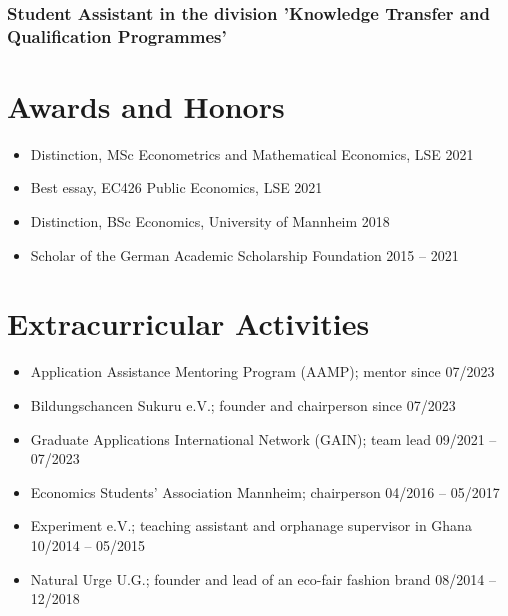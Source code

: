 \documentclass[a4paper, english, 10pt]{cv_class}
\begin{document}
\subsubsection{Student Assistant in the division 'Knowledge Transfer and Qualification Programmes'}

\section{Awards and Honors}

\begin{itemize}[noitemsep]
	\item Distinction, MSc Econometrics and Mathematical Economics, LSE \hfill 2021
	\item Best essay, EC426 Public Economics, LSE \hfill 2021
	\item Distinction, BSc Economics, University of Mannheim \hfill 2018
	\item Scholar of the German Academic Scholarship Foundation \hfill 2015 -- 2021
\end{itemize}

\section{Extracurricular Activities}

\begin{itemize}[noitemsep]
	\item Application Assistance Mentoring Program (AAMP); mentor \hfill since 07/2023
	\item Bildungschancen Sukuru e.V.; founder and chairperson \hfill since 07/2023
	\item Graduate Applications International Network (GAIN); team lead \hfill 09/2021 -- 07/2023
	\item Economics Students' Association Mannheim; chairperson \hfill 04/2016 -- 05/2017
	\item Experiment e.V.; teaching assistant and orphanage supervisor in Ghana \hfill 10/2014 -- 05/2015
	\item Natural Urge U.G.; founder and lead of an eco-fair fashion brand \hfill 08/2014 -- 12/2018
\end{itemize}
\end{document}
